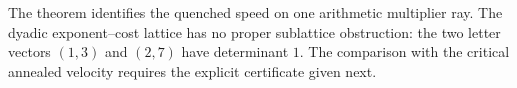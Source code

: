 \begin{remark}
The theorem identifies the quenched speed on one arithmetic multiplier ray.
The dyadic exponent--cost lattice has no proper sublattice obstruction:
the two letter vectors \((1,3)\) and \((2,7)\) have determinant \(1\).
The comparison with the critical annealed velocity requires the explicit
certificate given next.
\end{remark}
\fi
